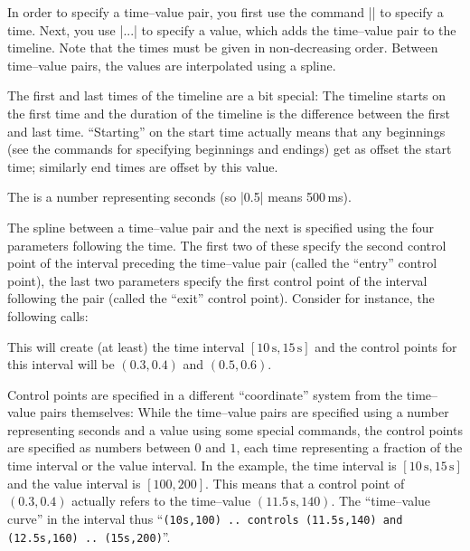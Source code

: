 In order to specify a time--value pair, you first use the command
|\pgfsys@animation@time| to specify a time. Next, you use
|\pgfsys@animation@val@...| to specify a value, which adds the
time--value pair to the timeline. Note that the times must be given in
non-decreasing order. Between time--value pairs, the values are
interpolated using a spline. 

The first and last times of the timeline are a bit special: The
timeline starts on the first time and the duration of the timeline is
the difference between the first and last time. ``Starting'' on the
start time actually means that any beginnings (see the commands for
specifying beginnings and endings) get as offset the start time;
similarly end times are offset by this value.

\begin{command}{\pgfsys@animation@time{}}
  The  is a number representing seconds (so |0.5| means
  500\,ms).

  The spline between a time--value pair and the next is specified
  using the four parameters following the time. The first two of these
  specify the second control point of the interval preceding the
  time--value pair (called the ``entry'' control point), the last two
  parameters specify the first control point of the interval following
  the pair (called the ``exit'' control point). Consider for instance,
  the following calls:
\begin{codeexample}
\end{codeexample}
  This will create (at least) the time interval $[10\,\mathrm
  s,15\,\mathrm s]$ and the control points for this interval will be
  $(0.3,0.4)$ and $(0.5,0.6)$.

  Control points are specified in a different ``coordinate'' system
  from the time--value pairs themselves: While the time--value pairs
  are specified using a number representing seconds and a value using
  some special commands, the control points are specified as numbers
  between $0$ and $1$, each time representing a fraction of the time
  interval or the value interval. In the example, the time interval is $[10\,\mathrm
  s,15\,\mathrm s]$ and the value interval is $[100,200]$. This means
  that a control point of $(0.3,0.4)$ actually refers to the
  time--value $(11.5\,\mathrm s,140)$. The ``time--value curve'' in
  the interval thus ``\texttt{(10s,100) .. controls (11.5s,140) and
    (12.5s,160) .. (15s,200)}''.


\end{command}

